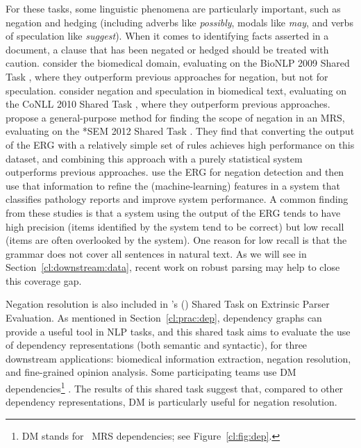 \documentclass[output=paper,nonflat]{langsci/langscibook}
\begin{document}
For these tasks, some linguistic phenomena are particularly important,
such as negation and hedging
(including adverbs like \textit{possibly}, modals like \textit{may}, and verbs of speculation like \textit{suggest}).
When it comes to identifying facts asserted in a document,
a clause that has been negated or hedged should be treated with caution.
\citet{mackinlay2012biomed} consider the biomedical domain,
evaluating on the BioNLP 2009 Shared Task \citep{kim2009task},
where they outperform previous approaches for negation, but not for speculation.
\citet{velldal2012specneg} consider negation and speculation in biomedical text,
evaluating on the CoNLL 2010 Shared Task \citep{farkas2010task},
where they outperform previous approaches.
\citet{packard2014neg} propose a general-purpose method for finding the scope of negation in an MRS,
evaluating on the *SEM 2012 Shared Task \citep{morante2012task}.
They find that converting the output of the ERG with a relatively simple set of rules
achieves high performance on this dataset,
and combining this approach with a purely statistical system
outperforms previous approaches.
\citet{zamaraeva2018pathology} use the ERG for negation detection and then
use that information to refine the (machine-learning) features in a 
system that classifies pathology reports and improve system performance.
A common finding from these studies
is that a system using the output of the ERG
tends to have high precision (items identified by the system tend to be correct)
but low recall (items are often overlooked by the system).
One reason for low recall is that the grammar does not cover all sentences in natural text.
As we will see in Section~\ref{cl:downstream:data},
recent work on robust parsing may help to close this coverage gap.

Negation resolution is also included in \citeauthor{oepen2017extrinsic}'s (\citeyear{oepen2017extrinsic})
Shared Task on Extrinsic Parser Evaluation.
As mentioned in Section~\ref{cl:prac:dep},
dependency graphs can provide a useful tool in NLP tasks,
and this shared task aims to evaluate the use of dependency representations (both semantic and syntactic),
for three downstream applications:
biomedical information extraction, negation resolution, and fine-grained opinion analysis.
Some participating teams use DM dependencies\footnote{DM stands for \delphin\ MRS dependencies; see Figure~\ref{cl:fig:dep}.} \citep{schuster2017dep,chen2017dep}.
The results of this shared task suggest that,
compared to other dependency representations,
DM is particularly useful for negation resolution.
\end{document}
